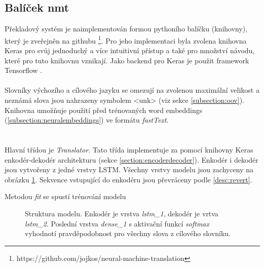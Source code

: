 \subsection{Balíček nmt}
Překladový systém je naimplementován formou pythoního balíčku (knihovny), který je zveřejněn na githubu \footnote{https://github.com/jojkos/neural-machine-translation}. Pro jeho implementaci byla zvolena knihovna Keras \cite{keras} pro svůj jednoduchý a více intuitivní přístup a také pro množství návodu, které pro tuto knihovnu vznikají. Jako backend pro Keras je použit framework Tensorflow \cite{tensorflow}.
\\\\
Slovníky výchozího a cílového jazyku se omezují na zvolenou maximální velikost a neznámá slova jsou nahrazeny symbolem <unk> (viz sekce \ref{subsection:oov}). Knihovna umožňuje použití před trénovaných word embeddings (\ref{subsection:neuralembeddings}) ve formátu \emph{fastText}.
\\\\\\
Hlavní třídou je \emph{Translator}. Tato třída implementuje za pomocí knihovny Keras enkodér-dekodér architekturu (sekce \ref{section:encoderdecoder}). Enkodér i dekodér jsou vytvořeny z jedné vrstvy LSTM. Všechny vrstvy modelu jsou zachyceny na obrázku \ref{img:model}. Sekvence vstupující do enkodéru jsou převráceny podle \ref{desc:revert}. 

Metodou \emph{fit} se spustí trénování modelu 


\begin{figure}[H]
    \begin{center}
    \end{center}
	\caption{Struktura modelu. Enkodér je vrstva \emph{lstm\_1}, dekodér je vrtva \emph{lstm\_2}. Poslední vrstva \emph{dense\_1} s aktivační funkcí \emph{softmax} vyhodnotí pravděpodobnost pro všechny slova z cílového slovníku.}
	\label{img:model}
\end{figure}



